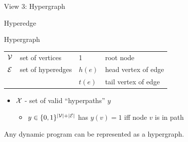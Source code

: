 \documentclass{beamer}
\def\im#1#2{
  \node(#1) [scale=#2]{\pgfbox[center,top]{\pgfuseimage{#1}}
};}
\newcommand{\air}{\vspace{0.5cm}}
\begin{document}

\begin{frame}
  \begin{center}
    \Large{View 3: Hypergraph}
  \end{center}
\end{frame}

\begin{frame}[t]{Hyperedge}
  \begin{figure}
    \centering
  \end{figure}
\end{frame}

\begin{frame}{Hypergraph}
  \begin{table}
    \centering
    
  \begin{tabular}{llll}
    ${\cal V}$ & set of vertices &    1 & root node \\
    ${\cal E}$ & set of hyperedges &   $h(e)$ &  head vertex of edge \\
   && $t(e)$ & tail vertex of edge \\
   \end{tabular}
  \end{table}

  \begin{itemize}
  \item ${\cal X}$ - set of valid ``hyperpaths'' $y$ 
    \begin{itemize}
    \item $y \in \{ 0,1 \}^{|{\cal V}| + |{\cal E}|}$ has $y(v) = 1$ iff node $v$ is in path
    \end{itemize}
  \end{itemize}

  \air 
  Any dynamic program can be represented as a hypergraph. 
\end{frame}

\begin{frame}[t]
  \vspace{-1cm}
  \begin{figure}
    \centering
  \end{figure}
\end{frame}
\end{document}

